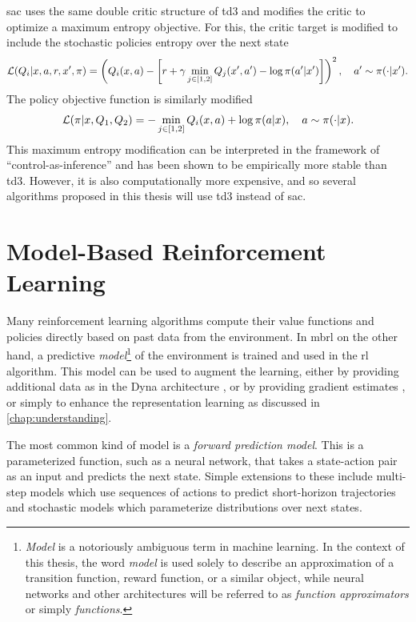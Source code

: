 \ac{sac} uses the same double critic structure of \ac{td3} and modifies the critic to optimize a maximum entropy objective.
For this, the critic target is modified to include the stochastic policies entropy over the next state
\begin{align}
    \mathcal{L}(Q_i| x, a, r, x', \pi) = \left(Q_i(x,a) - \left[r + \gamma \min_{j \in [1,2]}Q_j(x', a') - \log \pi(a'|x')\right]\right)^2, \quad a'\sim\pi(\cdot|x').
\end{align}
The policy objective function is similarly modified
\begin{align}
    \mathcal{L}(\pi| x, Q_1, Q_2) = - \min_{j \in [1,2]} Q_i(x, a) + \log \pi(a|x), \quad a\sim\pi(\cdot|x).
\end{align}
This maximum entropy modification can be interpreted in the framework of ``control-as-inference'' and has been shown to be empirically more stable than \ac{td3}.
However, it is also computationally more expensive, and so several algorithms proposed in this thesis will use \ac{td3} instead of \ac{sac}.

\section{Model-Based Reinforcement Learning}
\label{sec:model_learning}

Many reinforcement learning algorithms compute their value functions and policies directly based on past data from the environment.
In \ac{mbrl} on the other hand, a predictive \emph{model}\footnote{\emph{Model} is a notoriously ambiguous term in machine learning. In the context of this thesis, the word \emph{model} is used solely to describe an approximation of a transition function, reward function, or a similar object, while neural networks and other architectures will be referred to as \emph{function approximators} or simply \emph{functions}.} of the environment is trained and used in the \ac{rl} algorithm.
This model can be used to augment the learning, either by providing additional data as in the Dyna architecture \parencite{dyna}, or by providing gradient estimates \parencite{hafner2020dream,amos2021model}, or simply to enhance the representation learning as discussed in \autoref{chap:understanding}.

The most common kind of model is a \emph{forward prediction model}.
This is a parameterized function, such as a neural network, that takes a state-action pair as an input and predicts the next state.
Simple extensions to these include multi-step models which use sequences of actions to predict short-horizon trajectories and stochastic models which parameterize distributions over next states.

